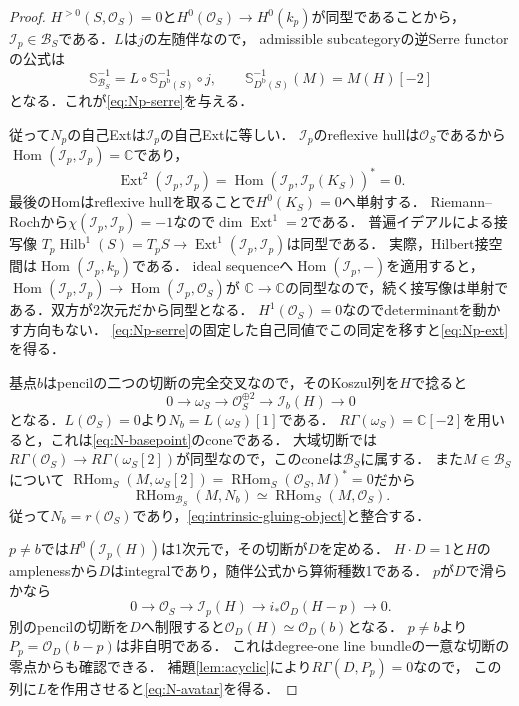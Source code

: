\documentclass[11pt,a4paper]{ltjsarticle}
\theoremstyle{definition}
\newcommand{\OO}{\mathcal O}
\newcommand{\BB}{\mathcal B}
\newcommand{\SSer}{\mathbb S}
\newcommand{\Db}{D^{\mathrm b}}
\newcommand{\RHom}{\operatorname{RHom}}
\newcommand{\Hom}{\operatorname{Hom}}
\newcommand{\Ext}{\operatorname{Ext}}
\newcommand{\Hilb}{\operatorname{Hilb}}
\begin{document}
\begin{proof}
$H^{>0}(S,\OO_S)=0$と$H^0(\OO_S)\to H^0(k_p)$が同型であることから，
$\mathcal I_p\in\BB_S$である．$L$は$j$の左随伴なので，
admissible subcategoryの逆Serre functorの公式は
\[
 \SSer_{\BB_S}^{-1}=L\circ\SSer_{\Db(S)}^{-1}\circ j,
 \qquad \SSer_{\Db(S)}^{-1}(M)=M(H)[-2]
\]
となる．これが\eqref{eq:Np-serre}を与える．

従って$N_p$の自己Extは$\mathcal I_p$の自己Extに等しい．
$\mathcal I_p$のreflexive hullは$\OO_S$であるから
$\Hom(\mathcal I_p,\mathcal I_p)=\mathbb C$であり，
\[
 \Ext^2(\mathcal I_p,\mathcal I_p)
 =\Hom(\mathcal I_p,\mathcal I_p(K_S))^*=0.
\]
最後のHomはreflexive hullを取ることで$H^0(K_S)=0$へ単射する．
Riemann--Rochから$\chi(\mathcal I_p,\mathcal I_p)=-1$なので$\dim\Ext^1=2$である．
普遍イデアルによる接写像
$T_p\Hilb^1(S)=T_pS\to\Ext^1(\mathcal I_p,\mathcal I_p)$は同型である．
実際，Hilbert接空間は$\Hom(\mathcal I_p,k_p)$である．
ideal sequenceへ$\Hom(\mathcal I_p,-)$を適用すると，
$\Hom(\mathcal I_p,\mathcal I_p)\to\Hom(\mathcal I_p,\OO_S)$が
$\mathbb C\to\mathbb C$の同型なので，続く接写像は単射である．双方が2次元だから同型となる．
$H^1(\OO_S)=0$なのでdeterminantを動かす方向もない．
\eqref{eq:Np-serre}の固定した自己同値でこの同定を移すと\eqref{eq:Np-ext}を得る．

基点$b$はpencilの二つの切断の完全交叉なので，そのKoszul列を$H$で捻ると
\begin{equation}\label{eq:basepoint-koszul}
 0\longrightarrow\omega_S\longrightarrow\OO_S^{\oplus2}
 \longrightarrow\mathcal I_b(H)\longrightarrow0
\end{equation}
となる．$L(\OO_S)=0$より$N_b=L(\omega_S)[1]$である．
$R\Gamma(\omega_S)=\mathbb C[-2]$を用いると，これは\eqref{eq:N-basepoint}のconeである．
大域切断では$R\Gamma(\OO_S)\to R\Gamma(\omega_S[2])$が同型なので，このconeは$\BB_S$に属する．
また$M\in\BB_S$について
$\RHom_S(M,\omega_S[2])=\RHom_S(\OO_S,M)^*=0$だから
\[
 \RHom_{\BB_S}(M,N_b)\simeq\RHom_S(M,\OO_S).
\]
従って$N_b=r(\OO_S)$であり，\eqref{eq:intrinsic-gluing-object}と整合する．

$p\ne b$では$H^0(\mathcal I_p(H))$は1次元で，その切断が$D$を定める．
$H\cdot D=1$と$H$のamplenessから$D$はintegralであり，随伴公式から算術種数1である．
$p$が$D$で滑らかなら
\[
 0\longrightarrow\OO_S\longrightarrow\mathcal I_p(H)
 \longrightarrow i_*\OO_D(H-p)\longrightarrow0.
\]
別のpencilの切断を$D$へ制限すると$\OO_D(H)\simeq\OO_D(b)$となる．
$p\ne b$より$P_p=\OO_D(b-p)$は非自明である．
これはdegree-one line bundleの一意な切断の零点からも確認できる．
補題\ref{lem:acyclic}により$R\Gamma(D,P_p)=0$なので，
この列に$L$を作用させると\eqref{eq:N-avatar}を得る．


\end{proof}
\end{document}
